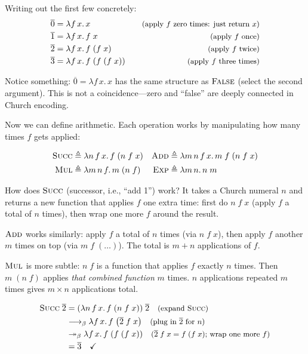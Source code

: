 \documentclass[11pt,a4paper]{article}
\theoremstyle{definition}
\newcommand{\lam}{\lambda}
\newcommand{\reduce}{\longrightarrow_\beta}
\newcommand{\reduces}{\twoheadrightarrow_\beta}
\newcommand{\church}[1]{\overline{#1}}
\newcommand{\FL}{\textsc{False}}
\newcommand{\rmark}[1]{\quad\text{\small(#1)}}
\begin{document}
Writing out the first few concretely:
\begin{align*}
\church{0} &= \lam f\, x.\, x &\rmark{apply $f$ zero times: just return $x$} \\
\church{1} &= \lam f\, x.\, f\;x &\rmark{apply $f$ once} \\
\church{2} &= \lam f\, x.\, f\;(f\;x) &\rmark{apply $f$ twice} \\
\church{3} &= \lam f\, x.\, f\;(f\;(f\;x)) &\rmark{apply $f$ three times}
\end{align*}

Notice something: $\church{0} = \lam f\, x.\, x$ has the same structure as
$\FL$ (select the second argument). This is not a coincidence---zero and
``false'' are deeply connected in Church encoding.

Now we can define arithmetic. Each operation works by manipulating how many
times $f$ gets applied:

\begin{align*}
\textsc{Succ}  &\triangleq \lam n\, f\, x.\, f\;(n\; f\; x) &
\textsc{Add}   &\triangleq \lam m\, n\, f\, x.\, m\; f\;(n\; f\; x) \\
\textsc{Mul}   &\triangleq \lam m\, n\, f.\, m\;(n\; f) &
\textsc{Exp}   &\triangleq \lam m\, n.\, n\; m
\end{align*}

How does $\textsc{Succ}$ (successor, i.e., ``add 1'') work? It takes a Church
numeral $n$ and returns a new function that applies $f$ one extra time:
first do $n\;f\;x$ (apply $f$ a total of $n$ times), then wrap one more $f$
around the result.

$\textsc{Add}$ works similarly: apply $f$ a total of $n$ times (via
$n\;f\;x$), then apply $f$ another $m$ times on top (via $m\;f\;(\ldots)$).
The total is $m + n$ applications of $f$.

$\textsc{Mul}$ is more subtle: $n\;f$ is a function that applies $f$ exactly
$n$ times. Then $m\;(n\;f)$ applies \emph{that combined function} $m$ times.
$n$ applications repeated $m$ times gives $m \times n$ applications total.

\begin{workedexample}[$\textsc{Succ}\;\church{2} = \church{3}$]
\begin{align*}
  \textsc{Succ}\;\church{2}
  &= (\lam n\, f\, x.\, f\;(n\; f\; x))\;\church{2}
    \rmark{expand $\textsc{Succ}$} \\
  &\reduce \lam f\, x.\, f\;\bigl(\church{2}\; f\; x\bigr)
    \rmark{plug in $\church{2}$ for $n$} \\
  &\reduces \lam f\, x.\, f\;(f\;(f\;x))
    \rmark{$\church{2}\;f\;x = f\;(f\;x)$; wrap one more $f$} \\
  &= \church{3} \quad\checkmark
\end{align*}
\end{workedexample}
\end{document}
